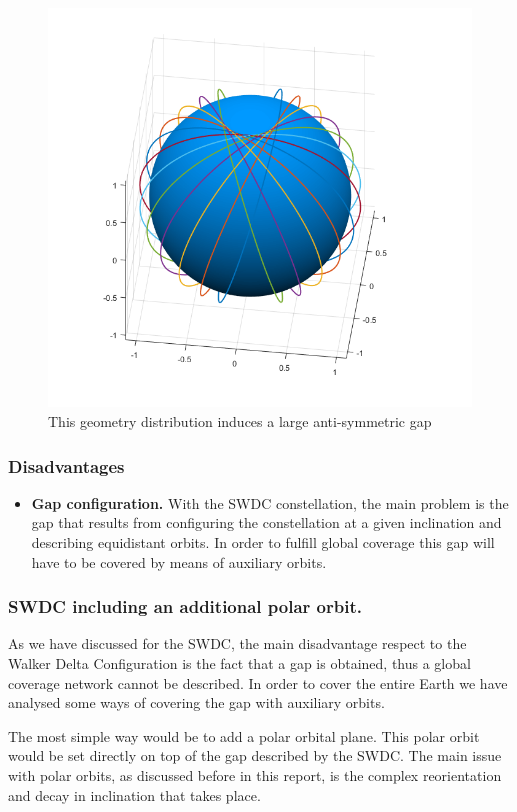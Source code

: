 \begin{figure}[H]
\includegraphics[width=12cm]{semiwalker12}
\centering
\caption{This geometry distribution induces a large anti-symmetric gap}
\end{figure}

\subsubsection{Disadvantages}
\begin{itemize}[label={--}]
\item\textbf{Gap configuration.} With the SWDC constellation, the main problem is the gap that results from configuring the constellation at a given inclination and describing equidistant orbits. In order to fulfill global coverage this gap will have to be covered by means of auxiliary orbits.
\end{itemize}

\subsubsection{SWDC including an additional polar orbit.}
As we have discussed for the SWDC, the main disadvantage respect to the Walker Delta Configuration is the fact that a gap is obtained, thus a global coverage network cannot be described. In order to cover the entire Earth we have analysed some ways of covering the gap with auxiliary orbits.

The most simple way would be to add a polar orbital plane. This polar orbit would be set directly on top of the gap described by the SWDC. The main issue with polar orbits, as discussed before in this report, is the complex reorientation and decay in inclination that takes place.


